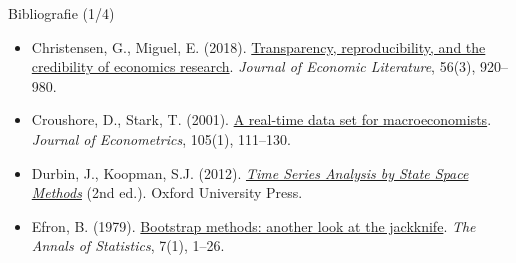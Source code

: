 \begin{frame}{Bibliografie (1/4)}
\begin{itemize}
    \item Christensen, G., Miguel, E. (2018). \href{https://doi.org/10.1257/jel.20171350}{Transparency, reproducibility, and the credibility of economics research}. \emph{Journal of Economic Literature}, 56(3), 920--980.
    \item Croushore, D., Stark, T. (2001). \href{https://doi.org/10.1016/S0304-4076(01)00072-0}{A real-time data set for macroeconomists}. \emph{Journal of Econometrics}, 105(1), 111--130.
    \item Durbin, J., Koopman, S.J. (2012). \href{https://doi.org/10.1093/acprof:oso/9780199641178.001.0001}{\emph{Time Series Analysis by State Space Methods}} (2nd ed.). Oxford University Press.
    \item Efron, B. (1979). \href{https://doi.org/10.1214/aos/1176344552}{Bootstrap methods: another look at the jackknife}. \emph{The Annals of Statistics}, 7(1), 1--26.
\end{itemize}
\end{frame}

